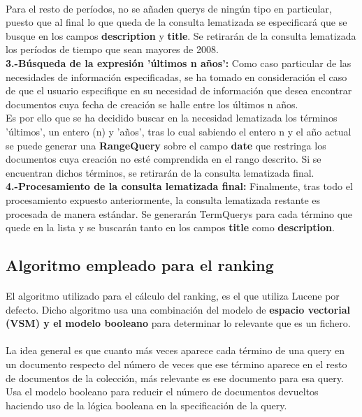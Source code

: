\documentclass[a4paper]{article}
\begin{document}
\begin{itemize}
	\paragraph{}Para el resto de períodos, no se añaden querys de ningún tipo en particular, puesto que al final lo que queda de la consulta lematizada se especificará que se busque en los campos \textbf{description} y \textbf{title}. Se retirarán de la consulta lematizada los períodos de tiempo que sean mayores de 2008.
	\\
	\newline \textbf{3.-Búsqueda de la expresión 'últimos n años':} Como caso particular de las necesidades de información especificadas, se ha tomado en consideración el caso de que el usuario especifique en su necesidad de información que desea encontrar documentos cuya fecha de creación se halle entre los últimos n años.
	\\ 
	\newline Es por ello que se ha decidido buscar en la necesidad lematizada los términos 'últimos', un entero (n) y 'años', tras lo cual sabiendo el entero n y el año actual se puede generar una \textbf{RangeQuery} sobre el campo \textbf{date} que restringa los documentos cuya creación no esté comprendida en el rango descrito. Si se encuentran dichos términos, se retirarán de la consulta lematizada final.
	\\
	\newline \textbf{4.-Procesamiento de la consulta lematizada final:} Finalmente, tras todo el procesamiento expuesto anteriormente, la consulta lematizada restante es procesada de manera estándar. Se generarán TermQuerys para cada término que quede en la lista y se buscarán tanto en los campos \textbf{title} como \textbf{description}.
\end{itemize}
\newpage
\subsection{Algoritmo empleado para el ranking}
\paragraph{}El algoritmo utilizado para el cálculo del ranking, es el que utiliza Lucene por defecto. Dicho algoritmo usa una combinación del modelo de \textbf{espacio vectorial (VSM) y el modelo booleano} para determinar lo relevante que es un fichero.
\paragraph{}La idea general es que cuanto más veces aparece cada término de una query en un documento respecto del número de veces que ese término aparece en el resto de documentos de la colección, más relevante es ese documento para esa query.
Usa el modelo booleano para reducir el número de documentos devueltos haciendo uso de la lógica booleana en la specificación de la query.
\end{document}
